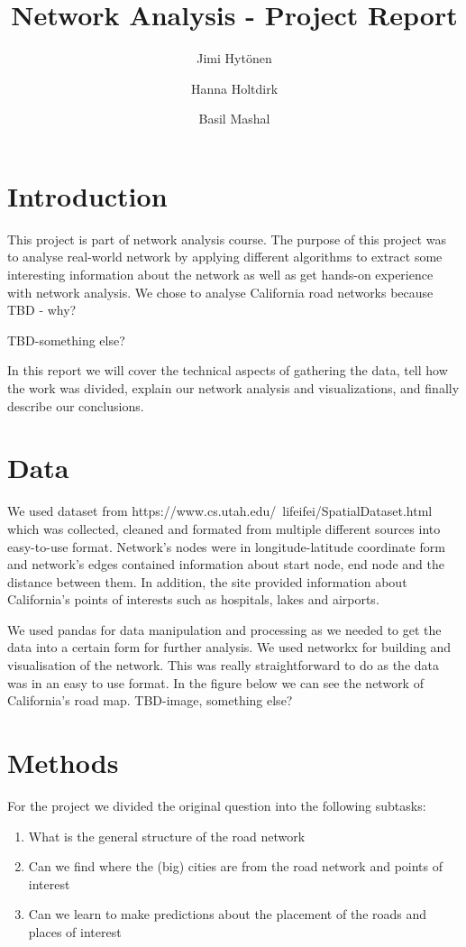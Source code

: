 \documentclass[11pt]{article}
\title{Network Analysis - Project Report}
\author{
    Jimi Hytönen\\
    \and Hanna Holtdirk\\
    \and Basil Mashal
}
\begin{document}
\maketitle

\section{Introduction}
This project is part of network analysis course. The purpose of this project was to analyse real-world network by applying different algorithms to extract some interesting information about the network as well as get hands-on experience with network analysis. We chose to analyse California road networks because TBD - why? 

TBD-something else?

In this report we will cover the technical aspects of gathering the data, tell how the work was divided, explain our network analysis and visualizations, and finally describe our conclusions. 



\section{Data}

We used dataset from https://www.cs.utah.edu/~lifeifei/SpatialDataset.html which was collected, cleaned and formated from multiple different sources into easy-to-use format. Network's nodes were in longitude-latitude coordinate form and network's edges contained information about start node, end node and the distance between them. In addition, the site provided information about California's points of interests such as hospitals, lakes and airports.

We used pandas for data manipulation and processing as we needed to get the data into a certain form for further analysis. We used networkx for building and visualisation of the network. This was really straightforward to do as the data was in an easy to use format. In the figure below we can see the network of California's road map. TBD-image, something else?

\newpage

\section{Methods}
For the project we divided the original question into the following subtasks: 
\begin{enumerate}
\item What is the general structure of the road network
\item Can we find where the (big) cities are from the road network and points of interest
\item Can we learn to make predictions about the placement of the roads and places of interest
\end{enumerate}
\end{document}
